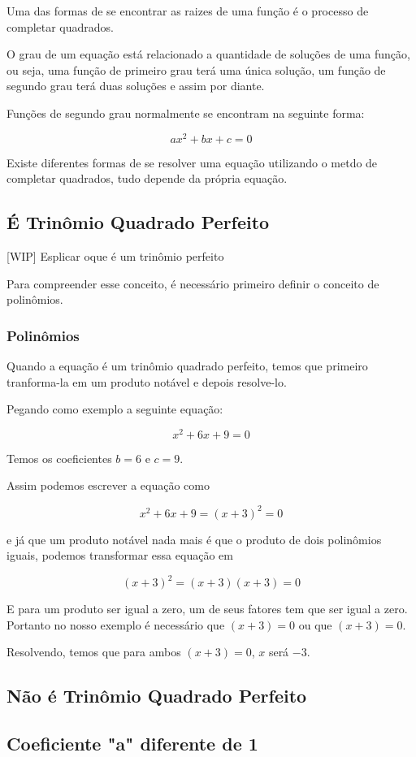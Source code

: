 \documentclass[../resumo.tex]{subfiles}
\begin{document}
	Uma das formas de se encontrar as raizes de uma função é o processo de completar quadrados.

	O grau de um equação está relacionado a quantidade de soluções de uma função, ou seja, uma função
	de primeiro grau terá uma única solução, um função de segundo grau terá duas soluções e assim por diante.

	Funções de segundo grau normalmente se encontram na seguinte forma:

	\[ ax^2 + bx + c = 0 \]

	Existe diferentes formas de se resolver uma equação utilizando o metdo de completar quadrados, tudo depende 
	da própria equação.

	\subsection{É Trinômio Quadrado Perfeito}

	[WIP] Esplicar oque é um trinômio perfeito

	Para compreender esse conceito, é necessário primeiro definir o conceito de polinômios.

	\subsubsection{Polinômios}


	Quando a equação é um trinômio quadrado perfeito, temos que primeiro tranforma-la em um produto notável
	e depois resolve-lo.

	Pegando como exemplo a seguinte equação:

	\[ x^2 + 6x + 9 = 0 \]

	Temos os coeficientes $b = 6$ e $c = 9$.

	Assim podemos escrever a equação como

	\[ x^2 + 6x + 9 = (x + 3)^2 = 0 \]

	e já que um produto notável nada mais é que o produto de dois polinômios iguais, podemos transformar 
	essa equação em

	\[ (x + 3)^2 = (x + 3)(x + 3) = 0 \]

	E para um produto ser igual a zero, um de seus fatores tem que ser igual a zero. Portanto no nosso exemplo
	é necessário que $(x + 3) = 0$ ou que $(x + 3) = 0$.

	Resolvendo, temos que para ambos $(x + 3) = 0$, $x$ será $-3$. 

	\subsection{Não é Trinômio Quadrado Perfeito}

	\subsection{Coeficiente "a" diferente de 1}
\end{document}
